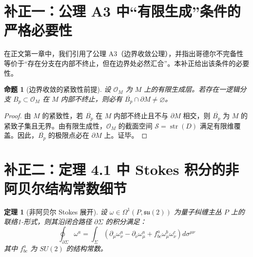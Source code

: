 \documentclass[11pt,a4paper]{article}
\newtheorem{theorem}{定理}
\newtheorem{proposition}{命题}
\begin{document}
\clearpage
\section*{补正一：公理 A3 中“有限生成”条件的严格必要性}
在正文第一章中，我们引用了公理 A3（边界收敛公理），并指出哥德尔不完备性等价于“存在分支在内部不终止，但在边界处必然汇合”。本补正给出该条件的必要性。

\begin{proposition}[边界收敛的紧致性前提]
设 \(\mathcal O_M\) 为 \(M\) 上的有限生成层。若存在一逻辑分支 \(B_p \subset \mathcal O_M\) 在 \(M\) 内部不终止，则必有 \(\overline{B_p} \cap \partial M \neq \varnothing\)。
\end{proposition}

\begin{proof}
由 \(M\) 的紧致性，若 \(\overline{B_p}\) 在 \(M\) 内部不终止且不与 \(\partial M\) 相交，则 \(\overline{B_p}\) 为 \(M\) 的紧致子集且无界。由有限生成性，\(\mathcal O_M\) 的截面空间 \(\mathcal S = \operatorname{str}(D)\) 满足有限维覆盖。因此，\(\overline{B_p}\) 的极限点必在 \(\partial M\) 上。证毕。
\end{proof}

\section*{补正二：定理 4.1 中 Stokes 积分的非阿贝尔结构常数细节}
\begin{theorem}[非阿贝尔 Stokes 展开]
设 \(\omega \in \Omega^1(P, \mathfrak{su}(2))\) 为量子纠缠主丛 \(P\) 上的联络1-形式，则其沿闭合路径 \(\partial \Sigma\) 的积分满足：
\[
\oint_{\partial \Sigma} \omega^a = \int_\Sigma \left( \partial_\mu \omega^a_\nu - \partial_\nu \omega^a_\mu + f^a_{bc} \omega^b_\mu \omega^c_\nu \right) d\sigma^{\mu\nu}
\]
其中 \(f^a_{bc}\) 为 \(SU(2)\) 的结构常数。
\end{theorem}
\end{document}
